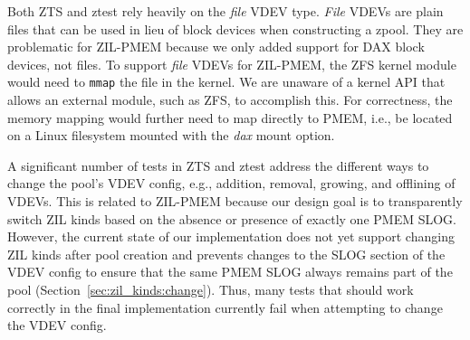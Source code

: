 \documentclass[12pt,a4paper,twoside]{book}
\begin{document}
{\begin{description}[noitemsep]
    \item[File VDEVs] Both ZTS and ztest rely heavily on the \textit{file} VDEV type.
        \textit{File} VDEVs are plain files that can be used in lieu of block devices when constructing a zpool.
        They are problematic for ZIL-PMEM because we only added support for DAX block devices, not files.
        To support \textit{file} VDEVs for ZIL-PMEM, the ZFS kernel module would need to \lstinline{mmap} the file in the kernel.
        We are unaware of a kernel API that allows an external module, such as ZFS, to accomplish this.
        For correctness, the memory mapping would further need to map directly to PMEM, i.e., be located on a Linux filesystem mounted with the \textit{dax} mount option.

    \item[VDEV Management]
        A significant number of tests in ZTS and ztest address the different ways to change the pool's VDEV config, e.g., addition, removal, growing, and offlining of VDEVs.
        This is related to ZIL-PMEM because our design goal is to transparently switch ZIL kinds based on the absence or presence of exactly one PMEM SLOG.
        However, the current state of our implementation does not yet support changing ZIL kinds after pool creation and prevents changes to the SLOG section of the VDEV config to ensure that the same PMEM SLOG always remains part of the pool (Section~\ref{sec:zil_kinds:change}).
        Thus, many tests that should work correctly in the final implementation currently fail when attempting to change the VDEV config.
\end{description}

}
\end{document}
